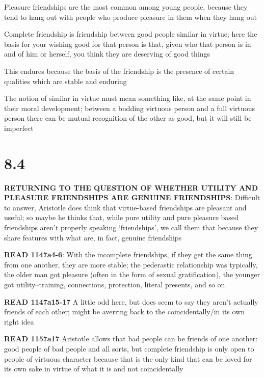 \documentclass[11pt]{article}
\begin{document}
\noindent Pleasure friendships are the most common among young people, because they tend to hang out with people who produce pleasure in them when they hang out
\vspace*{2mm}

\noindent Complete friendship is friendship between good people similar in virtue; here the basis for your wishing good for that person is that, given who that person is in and of him or herself, you think they are deserving of good things
\vspace*{2mm}

\noindent This endures because the basis of the friendship is the presence of certain qualities which are stable and enduring\vspace*{2mm}

\noindent The notion of similar in virtue must mean something like, at the same point in their moral development; between a budding virtuous person and a full virtuous person there can be mutual recognition of the other as good, but it will still be imperfect

\section*{8.4}

\noindent\textbf{RETURNING TO THE QUESTION OF WHETHER UTILITY AND PLEASURE FRIENDSHIPS ARE GENUINE FRIENDSHIPS}: Difficult to answer, Aristotle does think that virtue-based friendships are pleasant and useful; so maybe he thinks that, while pure utility and pure pleasure based friendships aren't properly speaking `friendships', we call them that because they share features with what are, in fact, genuine friendships
\vspace*{2mm}

\noindent\textbf{READ 1147a4-6}: With the incomplete friendships, if they get the same thing from one another, they are more stable; the pederastic relationship was typically, the older man got pleasure (often in the form of sexual gratification), the younger got utility--training, connections, protection, literal presents, and so on
\vspace*{2mm}

\noindent\textbf{READ 1147a15-17} A little odd here, but does seem to say they aren't actually friends of each other; might be averring back to the coincidentally/in its own right idea
\vspace*{2mm}

\noindent \textbf{READ 1157a17} Aristotle allows that bad people can be friends of one another: good people of bad people and all sorts, but complete friendship is only open to people of virtuous character because that is the only kind that can be loved for its own sake in virtue of what it is and not coincidentally
\end{document}
